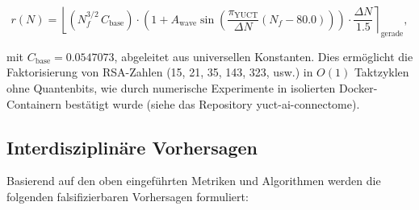 \documentclass[12pt,a4paper]{article}
\theoremstyle{remark}
\newcommand{\piYUCT}{\pi_{\mathrm{YUCT}}}
\begin{document}
	\begin{equation}
		r(N) = \left\lfloor (N_f^{3/2} \, C_{\text{base}}) \cdot
		\left(1 + A_{\text{wave}} \sin\left( \frac{\piYUCT}{\Delta N} (N_f - 80.0) \right) \right) \cdot \frac{\Delta N}{1.5} \right\rceil_{\text{gerade}},
		\label{eq:shor_period}
	\end{equation}
	
	mit \(C_{\text{base}} = 0.0547073\), abgeleitet aus universellen Konstanten.
	Dies ermöglicht die Faktorisierung von RSA-Zahlen (15, 21, 35, 143, 323, usw.)
	in \(O(1)\) Taktzyklen ohne Quantenbits, wie durch numerische Experimente in
	isolierten Docker-Containern bestätigt wurde (siehe das Repository
	yuct-ai-connectome).
	
	\subsection{Interdisziplinäre Vorhersagen}
	\label{subsec:predictions-complexity}
	
	Basierend auf den oben eingeführten Metriken und Algorithmen werden die
	folgenden falsifizierbaren Vorhersagen formuliert:
	
\end{document}
